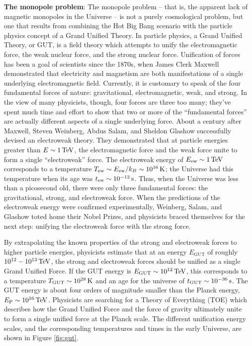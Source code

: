 \documentclass[a4paper,11pt]{article}
\begin{document}
{\noindent}\textbf{The monopole problem}: The monopole problem -- that is, the apparent lack of magnetic monopoles in the Universe -- is not a purely cosmological problem, but one that results from combining the Hot Big Bang scenario with the particle physics concept of a Grand Unified Theory. In particle physics, a Grand Unified Theory, or GUT, is a field theory which attempts to unify the electromagnetic force, the weak nuclear force, and the strong nuclear force. Unification of forces has been a goal of scientists since the 1870s, when James Clerk Maxwell demonstrated that electricity and magnetism are both manifestations of a single underlying electromagnetic field. Currently, it is customary to speak of the four fundamental forces of nature: gravitational, electromagnetic, weak, and strong. In the view of many physicists, though, four forces are three too many; they've spent much time and effort to show that two or more of the ``fundamental forces'' are actually different aspects of a single underlying force. About a century after Maxwell, Steven Weinberg, Abdus Salam, and Sheldon Glashow successfully devised an electroweak theory. They demonstrated that at particle energies greater than $E\sim1\,{\rm TeV}$, the electromagnetic force and the weak force unite to form a single ``electroweak'' force. The electroweak energy of $E_\mathrm{ew}\sim1\,{\rm TeV}$ corresponds to a temperature $T_\mathrm{ew}\sim E_\mathrm{ew}/k_B\sim10^{16}\,{\rm K}$; the Universe had this temperature when its age was $t_\mathrm{ew}\sim10^{-12}\,{\rm s}$. Thus, when the Universe was less than a picosecond old, there were only three fundamental forces: the gravitational, strong, and electroweak force. When the predictions of the electroweak energy were confirmed experimentally, Weinberg, Salam, and Glashow toted home their Nobel Prizes, and physicists braced themselves for the next step: unifying the electroweak force with the strong force.

{\noindent}By extrapolating the known properties of the strong and electroweak forces to higher particle energies, physicists estimate that at an energy $E_\mathrm{GUT}$ of roughly $10^{12}-10^{13}\,{\rm TeV}$, the strong and electroweak forces should be unified as a single Grand Unified Force. If the GUT energy is $E_\mathrm{GUT}\sim10^{12}\,{\rm TeV}$, this corresponds to a temperature $T_\mathrm{GUT}\sim10^{28}\,{\rm K}$ and an age for the universe of $t_\mathrm{GUT}\sim10^{-36}\,{\rm s}$. The GUT energy is about four orders of magnitude smaller than the Planck energy, $E_\mathrm{P}\sim10^{16}\,{\rm TeV}$. Physicists are searching for a Theory of Everything (TOE) which describes how the Grand Unified Force and the force of gravity ultimately unite to form a single unified force at the Planck scale. The different unification energy scales, and the corresponding temperatures and times in the early Universe, are shown in Figure \ref{fig:gut}.
\end{document}

